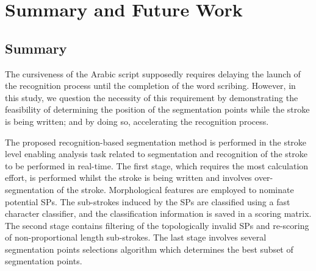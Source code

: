 %
%
%

\chapter{Summary and Future Work}
\label{chap:summary}

\section{Summary}
\label{sec:summary}

The cursiveness of the Arabic script supposedly requires delaying the launch of the recognition process until the completion of the word scribing. 
However, in this study, we question the necessity of this requirement by demonstrating the feasibility of determining the position of the segmentation points while the stroke is being written; and by doing so, accelerating the recognition process.

The proposed recognition-based segmentation method is performed in the stroke level enabling analysis task related to segmentation and recognition of the stroke to be performed in real-time. 
The first stage, which requires the most calculation effort, is performed whilst the stroke is being written and involves over-segmentation of the stroke.
Morphological features are employed to nominate potential SPs.
The sub-strokes induced by the SPs are classified using a fast character classifier, and the classification information is saved in a scoring matrix.
The second stage contains filtering of the topologically invalid SPs and re-scoring of non-proportional length sub-strokes. 
The last stage involves several segmentation points selections algorithm which determines the best subset of segmentation points.

